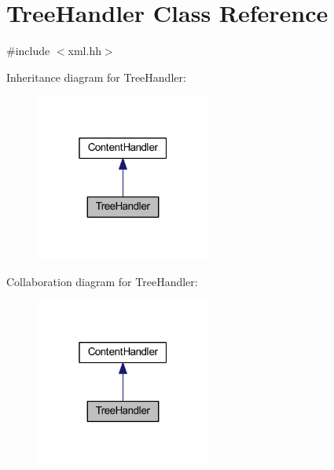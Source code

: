 \hypertarget{class_tree_handler}{}\section{Tree\+Handler Class Reference}
\label{class_tree_handler}


{\ttfamily \#include $<$xml.\+hh$>$}



Inheritance diagram for Tree\+Handler\+:
\nopagebreak
\begin{figure}[H]
\begin{center}
\leavevmode
\includegraphics[width=163pt]{class_tree_handler__inherit__graph}
\end{center}
\end{figure}


Collaboration diagram for Tree\+Handler\+:
\nopagebreak
\begin{figure}[H]
\begin{center}
\leavevmode
\includegraphics[width=163pt]{class_tree_handler__coll__graph}
\end{center}
\end{figure}
